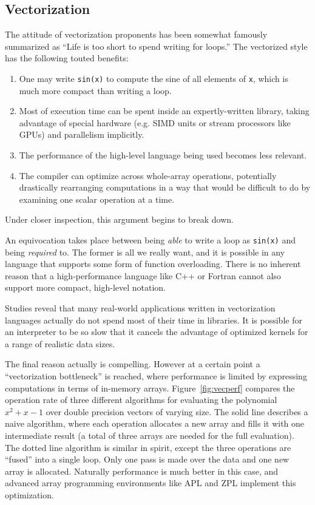 {%

\subsection{Vectorization}

The attitude of vectorization proponents has been somewhat famously
summarized as ``Life is too short to spend writing for loops.'' \cite{1998matlab}
The vectorized style has the following touted benefits:

\begin{enumerate}
\item One may write \texttt{sin(x)} to compute the sine of
all elements of \texttt{x}, which is much more compact than writing a loop.
\item Most of execution time can be spent inside an expertly-written library,
taking advantage of special hardware (e.g. SIMD units or stream processors
like GPUs) and parallelism implicitly.
\item The performance of the high-level language being used becomes less
relevant.
\item The compiler can optimize across whole-array operations, potentially
drastically rearranging computations in a way that would be difficult to do
by examining one scalar operation at a time.
\end{enumerate}

Under closer inspection, this argument begins to break down.

An equivocation takes place between being \emph{able} to write a loop
as \texttt{sin(x)} and being \emph{required} to.
The former is all we really want, and it is possible in any language that
supports some form of function overloading.
There is no inherent reason that a high-performance language like C++ or
Fortran cannot also support more compact, high-level notation.

Studies reveal that many real-world applications written in vectorization
languages actually do not spend most of their time in libraries.
\cite{evaluatingR}
It is possible for an interpreter to be so slow that it cancels
the advantage of optimized kernels for a range of realistic data sizes.

The final reason actually is compelling. However at a certain point a
``vectorization bottleneck'' is reached, where performance is limited by
expressing computations in terms of in-memory arrays.
Figure~\ref{fig:vecperf} compares the operation rate of three different
algorithms for evaluating the polynomial $x^2+x-1$ over double precision
vectors of varying size.
The solid line describes a naive algorithm, where each operation allocates
a new array and fills it with one intermediate result (a total of three
arrays are needed for the full evaluation).
The dotted line algorithm is similar in spirit, except the three operations
are ``fused'' into a single loop.
Only one pass is made over the data and one new array is allocated.
Naturally performance is much better in this case, and advanced array
programming environments like APL \cite{APL} and ZPL \cite{ZPL} implement
this optimization.

}
